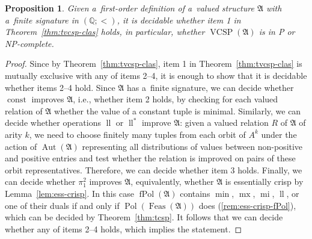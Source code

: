 \documentclass[preprint,12pt]{elsarticle}
\newcommand{\Q}{\mathbb Q}
\newcommand{\bA}{{\mathfrak A}}
\newcommand{\checked}[1]{#1}
\DeclareMathOperator{\Aut}{Aut}
\DeclareMathOperator{\fPol}{fPol}
\DeclareMathOperator{\VCSP}{VCSP}
\DeclareMathOperator{\Pol}{Pol}
\DeclareMathOperator{\Feas}{Feas}
\DeclareMathOperator{\mi}{mi}
\DeclareMathOperator{\lele}{ll}
\DeclareMathOperator{\mx}{mx}
\DeclareMathOperator{\const}{const}
\newtheorem{proposition}[theorem]{Proposition}
\begin{document}
\begin{proposition}\label{prop:dec}
Given a~first-order definition of a~valued structure $\bA$ with a~finite signature
in $(\Q;<)$, 
it is decidable whether \checked{item 1 in Theorem~\ref{thm:tvcsp-clas} holds, in particular, whether} $\VCSP(\bA)$ is in P or NP-complete.
\end{proposition}

\begin{proof}
\checked{Since by Theorem~\ref{thm:tvcsp-clas}, item 1 in Theorem~\ref{thm:tvcsp-clas} is mutually exclusive with any of items 2--4, it is enough to show that it is decidable whether items 2--4 hold.}
Since $\bA$ has a~finite signature, we can decide whether $\const$ improves $\bA$, i.e., whether item 2 holds, by checking for each valued relation of $\bA$ whether the value of a constant tuple is minimal. Similarly, we can decide whether \checked{operations $\lele$ or $\lele^*$ improve} $\bA$: \checked{given a valued relation $R$ of $\bA$ of arity $k$, we need to choose finitely many tuples from each orbit of $A^k$ under the action of $\Aut(\bA)$ representing all distributions of values between non-positive and positive entries and test whether the relation is improved on pairs of these orbit representatives.} 
Therefore, we can decide whether item 3 holds. Finally, we can decide whether $\pi_1^2$ improves $\bA$, \checked{equivalently, whether} $\bA$ is essentially crisp by Lemma~\ref{lem:ess-crisp}. In this case $\fPol(\bA)$ contains $\min$, $\mx$, $\mi$, $\lele$, or one of their duals if and only if $\Pol(\Feas(\bA))$ does (\cref{rem:ess-crisp-fPol}), which can be decided by Theorem~\ref{thm:tcsp}.
It follows that we can decide whether \checked{any of} items 2--4 holds, which implies the statement.
\end{proof}
\end{document}
